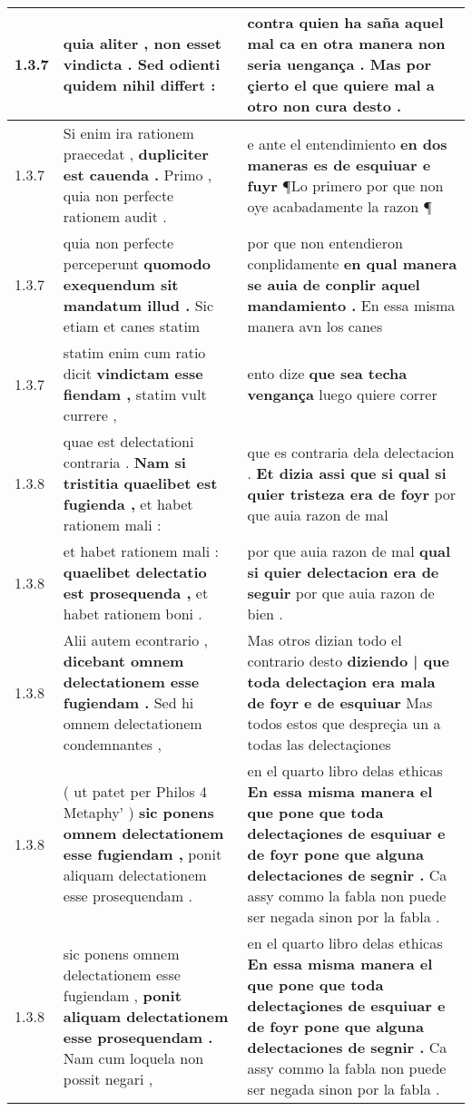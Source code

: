 \begin{tabular}{|p{1cm}|p{6.5cm}|p{6.5cm}|}
1.3.7 & quia aliter , \textbf{ non esset vindicta . } Sed odienti quidem nihil differt : & contra quien ha saña aquel mal \textbf{ ca en otra manera non seria uengança . } Mas por çierto el que quiere mal a otro non cura desto . \\\hline
1.3.7 & Si enim ira rationem praecedat , \textbf{ dupliciter est cauenda . } Primo , quia non perfecte rationem audit . & e ante el entendimiento \textbf{ en dos maneras es de esquiuar e fuyr } ¶Lo primero por que non oye acabadamente la razon ¶ \\\hline
1.3.7 & quia non perfecte perceperunt \textbf{ quomodo exequendum sit mandatum illud . } Sic etiam et canes statim & por que non entendieron conplidamente \textbf{ en qual manera se auia de conplir aquel mandamiento . } En essa misma manera avn los canes \\\hline
1.3.7 & statim enim cum ratio dicit \textbf{ vindictam esse fiendam , } statim vult currere , & ento dize \textbf{ que sea techa vengança } luego quiere correr \\\hline
1.3.8 & quae est delectationi contraria . \textbf{ Nam si tristitia quaelibet est fugienda , } et habet rationem mali : & que es contraria dela delectacion . \textbf{ Et dizia assi que si qual si quier tristeza era de foyr } por que auia razon de mal \\\hline
1.3.8 & et habet rationem mali : \textbf{ quaelibet delectatio est prosequenda , } et habet rationem boni . & por que auia razon de mal \textbf{ qual si quier delectacion era de seguir } por que auia razon de bien . \\\hline
1.3.8 & Alii autem econtrario , \textbf{ dicebant omnem delectationem esse fugiendam . } Sed hi omnem delectationem condemnantes , & Mas otros dizian todo el contrario desto \textbf{ diziendo | que toda delectaçion era mala de foyr e de esquiuar } Mas todos estos que despreçia un a todas las delectaçiones \\\hline
1.3.8 & ( ut patet per Philos 4 Metaphy’ ) \textbf{ sic ponens omnem delectationem esse fugiendam , } ponit aliquam delectationem esse prosequendam . & en el quarto libro delas ethicas \textbf{ En essa misma manera el que pone que toda delectaçiones de esquiuar e de foyr pone que alguna delectaciones de segnir . } Ca assy commo la fabla non puede ser negada sinon por la fabla . \\\hline
1.3.8 & sic ponens omnem delectationem esse fugiendam , \textbf{ ponit aliquam delectationem esse prosequendam . } Nam cum loquela non possit negari , & en el quarto libro delas ethicas \textbf{ En essa misma manera el que pone que toda delectaçiones de esquiuar e de foyr pone que alguna delectaciones de segnir . } Ca assy commo la fabla non puede ser negada sinon por la fabla . \\\hline

\end{tabular}
